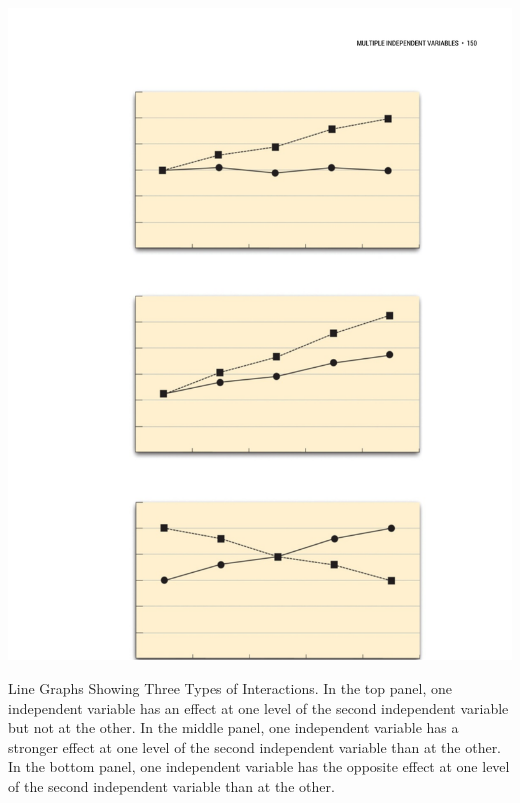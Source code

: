 \begin{marginfigure}[0in]

\includegraphics[width=\linewidth]{figures/C8interactionlines.pdf}

\caption{Line Graphs Showing Three Types of Interactions. In the top panel, one independent variable has an effect at one level of the second independent variable but not at the other. In the middle panel, one independent variable has a stronger effect at one level of the second independent variable than at the other. In the bottom panel, one independent variable has the opposite effect at one level of the second independent variable than at the other.}

\label{fig:interactionlines}

\end{marginfigure}

